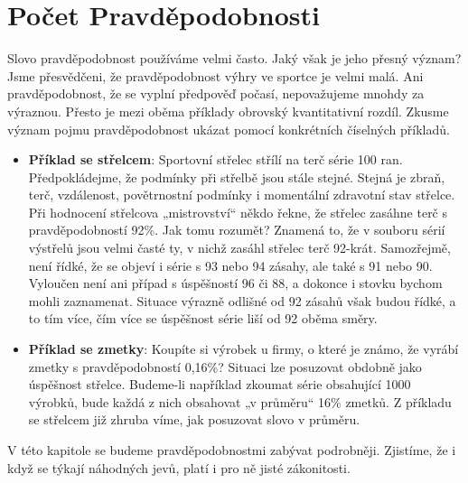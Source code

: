 \chapter{Počet Pravděpodobnosti}
\minitoc
  Slovo pravděpodobnost používáme velmi často. Jaký však je jeho přesný význam? Jsme přesvědčeni, 
  že pravděpodobnost výhry ve sportce je velmi malá. Ani pravděpodobnost, že se vyplní předpověď 
  počasí, nepovažujeme mnohdy za výraznou. Přesto je mezi oběma příklady obrovský kvantitativní 
  rozdíl. Zkusme význam pojmu pravděpodobnost ukázat pomocí konkrétních číselných příkladů.
  
  \begin{itemize}
    \item \textbf{Příklad se střelcem}: Sportovní střelec střílí na terč série \num{100} ran. 
          Předpokládejme, že podmínky při střelbě jsou stále stejné. Stejná je zbraň, terč, 
          vzdálenost, povětrnostní podmínky i momentální zdravotní stav střelce. Při hodnocení 
          střelcova „mistrovství“ někdo řekne, že střelec zasáhne terč s pravděpodobností 
          \num{92}\%. Jak tomu rozumět? Znamená to, že v souboru sérií výstřelů jsou velmi časté 
          ty, v nichž zasáhl střelec terč \num{92}-krát. Samozřejmě, není řídké, že se objeví i 
          série s \num{93} nebo \num{94} zásahy, ale také s \num{91} nebo \num{90}. Vyloučen není 
          ani případ s úspěšností \num{96} či \num{88}, a dokonce i stovku bychom mohli zaznamenat. 
          Situace výrazně odlišné od \num{92} zásahů však budou řídké, a to tím více, čím více se 
          úspěšnost série liší od \num{92} oběma směry.
    \item \textbf{Příklad se zmetky}: Koupíte si výrobek u firmy, o které je známo, že vyrábí 
          zmetky s pravděpodobností 0,16\%? Situaci lze posuzovat obdobně jako úspěšnost střelce. 
          Budeme-li například zkoumat série obsahující 1000 výrobků, bude každá z nich obsahovat „v 
          průměru“ 16\% zmetků. Z příkladu se střelcem již zhruba víme, jak posuzovat slovo v 
          průměru.
  \end{itemize}
  
  V této kapitole se budeme pravděpodobnostmi zabývat podrobněji. Zjistíme, že i když se týkají 
  náhodných jevů, platí i pro ně jisté zákonitosti.
    
